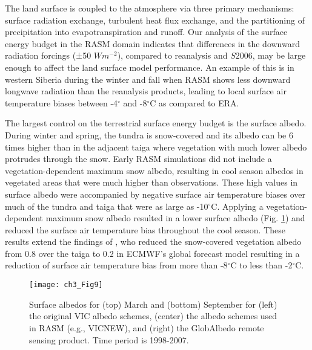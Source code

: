 The land surface is coupled to the atmosphere via three primary mechanisms: surface radiation exchange, turbulent heat flux exchange, and the partitioning of precipitation into evapotranspiration and runoff.
Our analysis of the surface energy budget in the RASM domain indicates that differences in the downward radiation forcings (±50 $W m^{-2}$), compared to reanalysis and $S2006$, may be large enough to affect the land surface model performance.
An example of this is in western Siberia during the winter and fall when RASM shows less downward longwave radiation than the reanalysis products, leading to local surface air temperature biases between -4$^{\circ}$ and -8$^{\circ}$C as compared to ERA.

The largest control on the terrestrial surface energy budget is the surface albedo.
During winter and spring, the tundra is snow-covered and its albedo can be 6 times higher than in the adjacent taiga \citep{Chapin_2000b} where vegetation with much lower albedo protrudes through the snow.
Early RASM simulations did not include a vegetation-dependent maximum snow albedo, resulting in cool season albedos in vegetated areas that were much higher than observations.
These high values in surface albedo were accompanied by negative surface air temperature biases over much of the tundra and taiga that were as large as -10$^{\circ}$C.
Applying a vegetation-dependent maximum snow albedo resulted in a lower surface albedo (Fig. \ref{fig:albedo_maps}) and reduced the surface air temperature bias throughout the cool season.
These results extend the findings of \citet{Viterbo_1999}, who reduced the snow-covered vegetation albedo from 0.8 over the taiga to 0.2 in ECMWF's global forecast model resulting in a reduction of surface air temperature bias from more than -8$^{\circ}$C to less than -2$^{\circ}$C.

\begin{figure}
  \centering
  \texttt{[image: ch3\_Fig9]}
  \caption{Surface albedos for (top) March and (bottom) September for (left) the original VIC albedo schemes, (center) the albedo schemes used in RASM (e.g., VICNEW), and (right) the GlobAlbedo remote sensing product.
  Time period is 1998-2007.}
  \label{fig:albedo_maps}
\end{figure}

